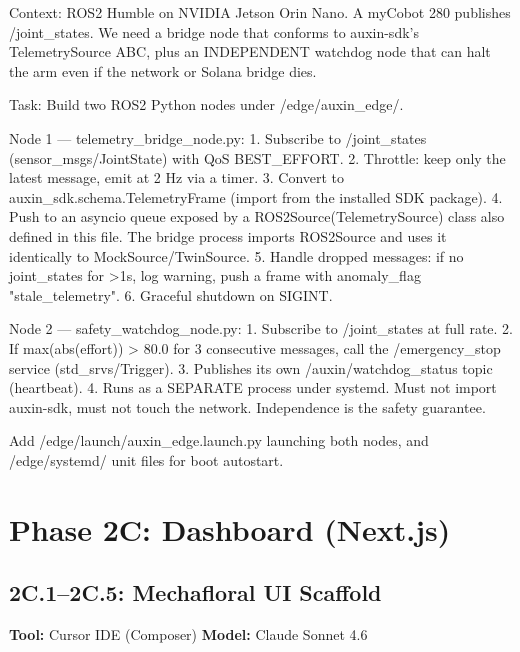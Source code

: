 \documentclass[11pt, a4paper]{article}
\begin{document}
\begin{promptbox}
Context: ROS2 Humble on NVIDIA Jetson Orin Nano. A myCobot 280 publishes /joint_states. We need a bridge node that conforms to auxin-sdk's TelemetrySource ABC, plus an INDEPENDENT watchdog node that can halt the arm even if the network or Solana bridge dies.

Task: Build two ROS2 Python nodes under /edge/auxin_edge/.

Node 1 --- telemetry_bridge_node.py:
1. Subscribe to /joint_states (sensor_msgs/JointState) with QoS BEST_EFFORT.
2. Throttle: keep only the latest message, emit at 2 Hz via a timer.
3. Convert to auxin_sdk.schema.TelemetryFrame (import from the installed SDK package).
4. Push to an asyncio queue exposed by a ROS2Source(TelemetrySource) class also defined in this file. The bridge process imports ROS2Source and uses it identically to MockSource/TwinSource.
5. Handle dropped messages: if no joint_states for >1s, log warning, push a frame with anomaly_flag "stale_telemetry".
6. Graceful shutdown on SIGINT.

Node 2 --- safety_watchdog_node.py:
1. Subscribe to /joint_states at full rate.
2. If max(abs(effort)) > 80.0 for 3 consecutive messages, call the /emergency_stop service (std_srvs/Trigger).
3. Publishes its own /auxin/watchdog_status topic (heartbeat).
4. Runs as a SEPARATE process under systemd. Must not import auxin-sdk, must not touch the network. Independence is the safety guarantee.

Add /edge/launch/auxin_edge.launch.py launching both nodes, and /edge/systemd/ unit files for boot autostart.
\end{promptbox}

\section{Phase 2C: Dashboard (Next.js)}

\subsection*{2C.1--2C.5: Mechafloral UI Scaffold}
\textbf{Tool:} Cursor IDE (Composer) \quad \textbf{Model:} Claude Sonnet 4.6
\end{document}
